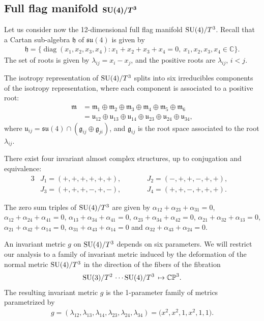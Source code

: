 \documentclass[pdftex]{sigma}%
\numberwithin{equation}{section}
\DeclareMathOperator{\Diag}{diag}
\begin{document}
\subsection[Full flag manifold \protect{SU(4)/T\textasciicircum{}3}]
{Full flag manifold $\boldsymbol{{\rm SU}(4)/T^3}$}

Let us consider now the 12-dimensional full flag manifold ${\rm SU}(4)/T^3$. Recall that a Cartan sub-algebra $\mathfrak{h}$ of $\mathfrak{su}(4)$ is given by
\begin{gather*}
\mathfrak{h}=\{\Diag(x_1,x_2,x_3,x_4)\colon x_1+x_2+x_3+x_4=0,\ x_1,x_2,x_3,x_4 \in\mathbb{C}\}.
\end{gather*}
The set of roots is given by $\lambda_{ij}=x_i - x_j$, and the positive roots are $\lambda_{ij}$, $i<j$.

The isotropy representation of ${\rm SU}(4)/T^3$ splits into six irreducibles components of the isotropy representation, where each component is associated to a positive root:
\begin{align*}
\mathfrak{m}&=\mathfrak{m}_{1}\oplus\mathfrak{m}_{2}\oplus \mathfrak{m}_{3}\oplus\mathfrak{m}_{4}\oplus\mathfrak{m}_{5}\oplus \mathfrak{m}_{6}
\\
&=\mathfrak{u}_{12}\oplus \mathfrak{u}_{13}\oplus \mathfrak{u}_{14}\oplus \mathfrak{u}_{23}\oplus \mathfrak{u}_{24}\oplus \mathfrak{u}_{34},
\end{align*}
where $\mathfrak{u}_{ij}=\mathfrak{su}(4)\cap (\mathfrak{g}_{ij}\oplus \mathfrak{g}_{ji})$, and $\mathfrak{g}_{ij}$ is the root space associated to the root $\lambda_{ij}$.

There exist four invariant almost complex structures, up to conjugation and equivalence:
\begin{alignat*}{3}
& J_{1}=(+,+,+,+,+,+),\qquad &&J_{2}=(-,+,+,-,+,+),&\\
&J_{3}=(+,+,+,-,+,-),\qquad &&J_{4}=(+,+,-,+,+,+).&
\end{alignat*}

The zero sum triples of ${\rm SU}(4)/T^3$ are given by
$\alpha_{12}+\alpha_{23}+\alpha_{31}=0$, $\alpha_{12}+\alpha_{24}+\alpha_{41}=0$, $\alpha_{13}+\alpha_{34}+\alpha_{41}=0$,
$\alpha_{23}+\alpha_{34}+\alpha_{42}=0$, $\alpha_{21}+\alpha_{32}+\alpha_{13}=0$, $\alpha_{21}+\alpha_{42}+\alpha_{14}=0$, $\alpha_{31}+\alpha_{43}+\alpha_{14}=0$ and $\alpha_{32}+\alpha_{43}+\alpha_{24}=0$.

An invariant metric $g$ on $ {\rm SU}(4)/T^3$ depends on six parameters. We will restrict our analysis to a family of invariant metric induced by the deformation of the normal metric ${\rm SU}(4)/T^3$ in the direction of the fibers of the fibration
\begin{gather*}
{\rm SU}(3)/T^2 \, \cdots {\rm SU}(4)/T^3 \, \mapsto \mathbb{CP}^3.
\end{gather*}
The resulting invariant metric $g$ is the 1-parameter family of metrics parametrized by
\begin{gather} \label{metric-su4}
 g=(\lambda_{12},\lambda_{13},\lambda_{14},\lambda_{23},\lambda_{24},\lambda_{34})=\big(x^{2},x^{2},1,x^{2},1,1\big).
 \end{gather}
\end{document}
